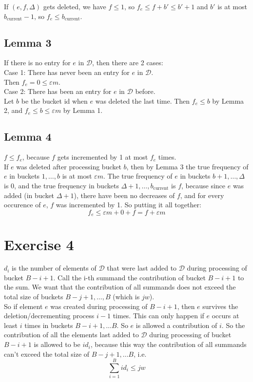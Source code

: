 \documentclass{article}
\begin{document}
If $(e, f, \Delta)$ gets deleted, we have $f \leq 1$, so $f_e \leq f+b' \leq b'+1$ and $b'$ is at most $b_{\text{current}}-1$, so $f_e \leq b_{\text{current}}$.

\subsection*{Lemma 3}
If there is no entry for $e$ in $\mathcal{D}$, then there are 2 cases:\\
Case 1: There has never been an entry for $e$ in $\mathcal{D}$. \\
Then $f_e = 0 \leq \varepsilon m$.\\
Case 2: There has been an entry for $e$ in $\mathcal{D}$ before.\\
Let $b$ be the bucket id when $e$ was deleted the last time. Then $f_e \leq b$ by Lemma 2, and $f_e \leq b \leq \varepsilon m $ by Lemma 1.

\subsection*{Lemma 4}
$f \leq f_e$, because $f$ gets incremented by 1 at most $f_e$ times. \\
If $e$ was deleted after processing bucket $b$, then by Lemma 3 the true frequency of $e$ in buckets $1, \hdots, b$ is at most $\varepsilon m$. The true frequency of $e$ in buckets $b+1, \hdots, \Delta$ is 0, and the true frequency in buckets $\Delta+1, \hdots, b_{\text{current}}$ is $f$, because since $e$ was added (in bucket $\Delta+1$), there have been no decreases of $f$,
and for every occurence of $e$, $f$ was incremented by 1. So putting it all together:
\[
f_e \leq \varepsilon m + 0 + f = f + \varepsilon m
\]

\newpage
\section*{Exercise 4}
$d_i$ is the number of elements of $\mathcal{D}$ that were last added to $\mathcal{D}$ during processing of bucket $B-i+1$. Call the i-th summand the contribution of bucket $B-i+1$ to the sum. We want that the contribution of all summands does not exceed the total size of buckets $B-j+1, \hdots, B$ (which is $jw$). \\

So if element $e$ was created during processing of $B-i+1$, then $e$ survives the
deletion/decrementing process $i-1$ times. This can only happen if $e$ occurs at least $i$ times in buckets $B-i+1, \hdots B$. So $e$ is allowed a contribution of $i$. So the contribution of all the elements last added to $\mathcal{D}$ during processing of bucket $B-i+1$ is allowed to be $id_i$, because this way the contribution of all summands can't exceed the total size of $B-j+1, \hdots B$, i.e.
\[
\sum_{i=1}^B id_i \leq jw
\]
\end{document}
